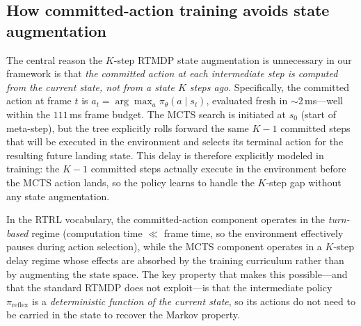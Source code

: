 \documentclass{article}
\begin{document}
\subsection*{How committed-action training avoids state augmentation}

The central reason the $K$-step RTMDP state augmentation is unnecessary in
our framework is that \emph{the committed action at each intermediate step is
computed from the current state, not from a state $K$ steps ago}.
Specifically, the committed action at frame $t$ is
$a_t = \arg\max_a \pi_\theta(a \mid s_t)$, evaluated fresh in $\sim$2\,ms---well
within the $111$\,ms frame budget.
The MCTS search is initiated at $s_0$ (start of meta-step), but the tree
explicitly rolls forward the same $K{-}1$ committed steps that will be executed
in the environment and selects its terminal action for the resulting future
landing state. This delay is therefore explicitly modeled in training: the
$K{-}1$ committed steps actually execute in the environment before the MCTS
action lands, so the policy learns to handle the $K$-step gap without any state
augmentation.

In the RTRL vocabulary, the committed-action component operates in the
\emph{turn-based} regime (computation time $\ll$ frame time, so the environment
effectively pauses during action selection), while the MCTS component operates
in a $K$-step delay regime whose effects are absorbed by the training curriculum
rather than by augmenting the state space.
The key property that makes this possible---and that the standard RTMDP does not
exploit---is that the intermediate policy $\pi_{\mathrm{reflex}}$ is a
\emph{deterministic function of the current state}, so its actions do not need
to be carried in the state to recover the Markov property.


\newpage

\end{document}
